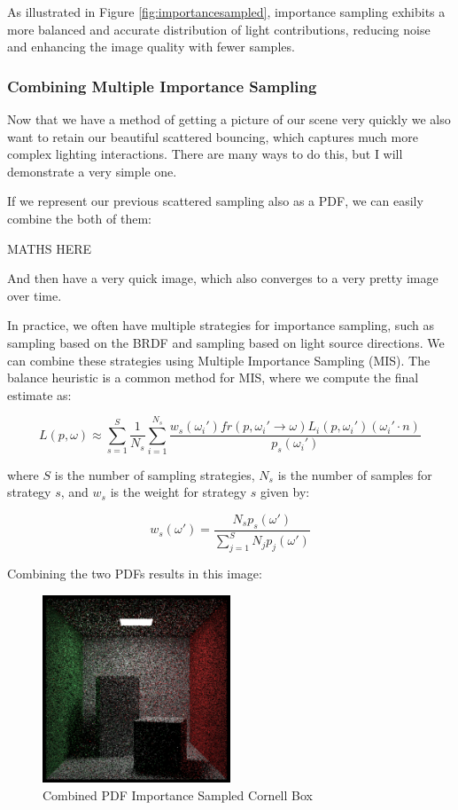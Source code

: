 \documentclass[12pt]{article}
\begin{document}
As illustrated in Figure \ref{fig:importancesampled}, importance sampling exhibits a more balanced and accurate distribution of light contributions, reducing noise and enhancing the image quality with fewer samples.

\subsubsection{Combining Multiple Importance Sampling}

Now that we have a method of getting a picture of our scene very quickly we also want to retain our beautiful scattered bouncing, which captures much more complex lighting interactions. There are many ways to do this, but I will demonstrate a very simple one.

If we represent our previous scattered sampling also as a PDF, we can easily combine the both of them:

MATHS HERE

And then have a very quick image, which also converges to a very pretty image over time.

In practice, we often have multiple strategies for importance sampling, such as sampling based on the BRDF and sampling based on light source directions. We can combine these strategies using Multiple Importance Sampling (MIS). The balance heuristic is a common method for MIS, where we compute the final estimate as:

\[
    L(p, \omega) \approx \sum_{s=1}^S \frac{1}{N_s} \sum_{i=1}^{N_s} \frac{w_s(\omega_i') fr(p, \omega_i' \to \omega) L_i(p, \omega_i') (\omega_i' \cdot n)}{p_s(\omega_i')}
\]

where \( S \) is the number of sampling strategies, \( N_s \) is the number of samples for strategy \( s \), and \( w_s \) is the weight for strategy \( s \) given by:

\[
    w_s(\omega') = \frac{N_s p_s(\omega')}{\sum_{j=1}^S N_j p_j(\omega')}
\]

Combining the two PDFs results in this image:

\begin{figure}[H]
    \centering
    \includegraphics[width=0.5\textwidth]{images/one_samp/combined_pdf.png}
    \caption{Combined PDF Importance Sampled Cornell Box}
    \label{fig:combinedPDFimportancesampled}
\end{figure}
\end{document}
